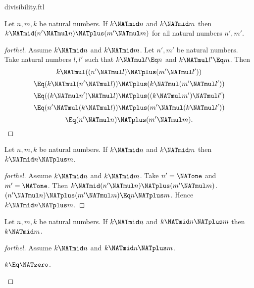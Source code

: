 \documentclass{stex}
\begin{document}
\begin{smodule}{divisibility.ftl}
\begin{proposition}[forthel]
  Let $n, m, k$ be natural numbers.
  If $k \NATmid n$ and $k \NATmid m$ then $k \NATmid (n' \NATmul n) \NATplus (m' \NATmul m)$
  for all natural numbers $n', m'$.
\end{proposition}
\begin{proof}[forthel]
  Assume $k \NATmid n$ and $k \NATmid m$.
  Let $n', m'$ be natural numbers.
  Take natural numbers $l,l'$ such that $k \NATmul l \Eq n$ and $k \NATmul l' \Eq m$.
  Then
  \[  k \NATmul ((n' \NATmul l) \NATplus (m' \NATmul l'))                \]
  \[    \Eq (k \NATmul (n' \NATmul l)) \NATplus (k \NATmul (m' \NATmul l'))  \]
  \[    \Eq ((k \NATmul n') \NATmul l) \NATplus ((k \NATmul m') \NATmul l')  \]
  \[    \Eq (n' \NATmul (k \NATmul l)) \NATplus (m' \NATmul (k \NATmul l'))  \]
  \[    \Eq (n' \NATmul n) \NATplus (m' \NATmul m).                      \]
\end{proof}

\begin{corollary}[forthel]
  Let $n, m, k$ be natural numbers.
  If $k \NATmid n$ and $k \NATmid m$ then $k \NATmid n \NATplus m$.
\end{corollary}
\begin{proof}[forthel]
  Assume $k \NATmid n$ and $k \NATmid m$.
  Take $n' = \NATone$ and $m' = \NATone$.
  Then $k \NATmid (n' \NATmul n) \NATplus (m' \NATmul m)$.
  $(n' \NATmul n) \NATplus (m' \NATmul m) \Eq n \NATplus m$.
  Hence $k \NATmid n \NATplus m$.
\end{proof}


\begin{proposition}[forthel,name=divisibility of summands]
  Let $n, m, k$ be natural numbers.
  If $k \NATmid n$ and $k \NATmid n \NATplus m$ then $k \NATmid m$.
\end{proposition}
\begin{proof}[forthel]
  Assume $k \NATmid n$ and $k \NATmid n \NATplus m$.

  \begin{case}{$k \Eq \NATzero$.} \end{case}


\end{proof}
\end{smodule}
\end{document}
